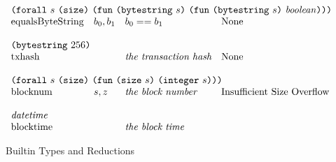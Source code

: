 \documentclass[../main.tex]{subfiles}
\begin{document}
\begin{figure*}[t]
\[\begin{array}{llll}
        \multicolumn{4}{l}{\forallT{s}{\sizeK{}}{\funT{\bytestringT{s}}{\funT{\bytestringT{s}}{\mathit{\mathit{boolean}}}}}}\\
        \mathrm{equalsByteString}  &   b_0 , b_1   & b_0 == b_1   &   \textrm{None}  \\
        &&\\
        
        \multicolumn{4}{l}{\bytestringT{256}}\\
        \mathrm{txhash} & & \textit{the transaction hash}   &   \textrm{None}  \\
        &&\\
        
        \multicolumn{4}{l}{\forallT{s}{\sizeK{}}{\funT{\sizeT{s}}{\integerT{s}}}}\\
        \mathrm{blocknum} & s, z & \textit{the block number}   &   \textrm{Insufficient Size Overflow}  \\
        &&\\
        
        \multicolumn{4}{l}{\mathit{datetime}}\\
        \mathrm{blocktime} & & \textit{the block time}   &   \textrm{}  \\
    \end{array}\]
    \normalsize
    \caption{Builtin Types and Reductions}
    \label{fig:Plutus_core_builtins}
\end{figure*}
\end{document}
